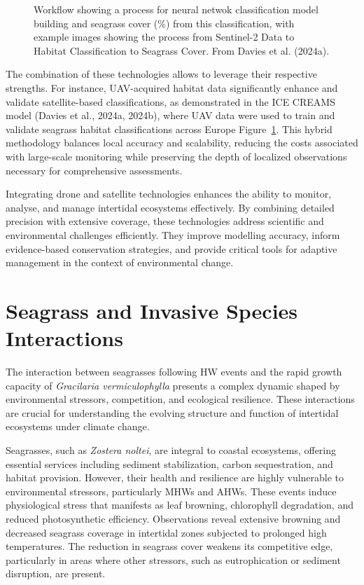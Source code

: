 \documentclass[
  letterpaper,
  11pt,
  english,
  singlespacing,
  headsepline]{MastersDoctoralThesis}
\begin{document}
\begin{spacing}{1.5}
\begin{figure}
{}

\caption{\label{fig-WorkflowBede}Workflow showing a process for neural
netwok classification model building and seagrass cover (\%) from this
classification, with example images showing the process from Sentinel-2
Data to Habitat Classification to Seagrass Cover. From Davies et al.
(2024a).}

\end{figure}%

The combination of these technologies allows to leverage their
respective strengths. For instance, UAV-acquired habitat data
significantly enhance and validate satellite-based classifications, as
demonstrated in the ICE CREAMS model (Davies et al., 2024a, 2024b),
where UAV data were used to train and validate seagrass habitat
classifications across Europe Figure~\ref{fig-WorkflowBede}. This hybrid
methodology balances local accuracy and scalability, reducing the costs
associated with large-scale monitoring while preserving the depth of
localized observations necessary for comprehensive assessments.

Integrating drone and satellite technologies enhances the ability to
monitor, analyse, and manage intertidal ecosystems effectively. By
combining detailed precision with extensive coverage, these technologies
address scientific and environmental challenges efficiently. They
improve modelling accuracy, inform evidence-based conservation
strategies, and provide critical tools for adaptive management in the
context of environmental change.

\section{Seagrass and Invasive Species
Interactions}\label{seagrass-and-invasive-species-interactions}

The interaction between seagrasses following HW events and the rapid
growth capacity of \emph{Gracilaria vermiculophylla} presents a complex
dynamic shaped by environmental stressors, competition, and ecological
resilience. These interactions are crucial for understanding the
evolving structure and function of intertidal ecosystems under climate
change.

Seagrasses, such as \emph{Zostera noltei}, are integral to coastal
ecosystems, offering essential services including sediment
stabilization, carbon sequestration, and habitat provision. However,
their health and resilience are highly vulnerable to environmental
stressors, particularly MHWs and AHWs. These events induce physiological
stress that manifests as leaf browning, chlorophyll degradation, and
reduced photosynthetic efficiency. Observations reveal extensive
browning and decreased seagrass coverage in intertidal zones subjected
to prolonged high temperatures. The reduction in seagrass cover weakens
its competitive edge, particularly in areas where other stressors, such
as eutrophication or sediment disruption, are present.


\end{spacing}
\end{document}

